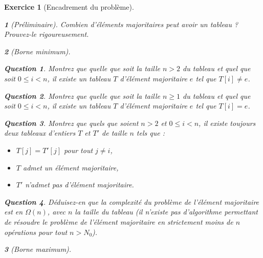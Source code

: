 \documentclass{article}
\theoremstyle{exostyle}
\newtheorem{exo}{Exercice}
\theoremstyle{partiestyle}
\newtheorem{partie}{}[exo]
\theoremstyle{questionstyle}
\newtheorem{questionpartie}{Question}[partie]
\begin{document}
\clearpage

\begin{exo}[Encadrement du problème]

\begin{partie}[Préliminaire]
Combien d'éléments majoritaires peut avoir un tableau ? Prouvez-le rigoureusement.
\end{partie}
\begin{partie}[Borne minimum]
\begin{questionpartie}
    Montrez que quelle que soit la taille $n > 2$ du tableau et quel que soit $0 \leq i < n$, il existe un tableau $T$ d'élément majoritaire $e$ tel que $T[i] \neq e$.
\end{questionpartie}
\begin{questionpartie}
    Montrez que quelle que soit la taille $n \geq 1$ du tableau et quel que soit $0 \leq i < n$, il existe un tableau $T$ d'élément majoritaire $e$ tel que $T[i] = e$.
\end{questionpartie}
\begin{questionpartie}
    Montrez que quels que soient $n>2$ et $0 \leq i < n$, il existe toujours deux tableaux d'entiers $T$ et $T'$ de taille $n$ tels que :
    \begin{itemize}
        \item $T[j] = T'[j]$ pour tout $j \neq i$,
        \item $T$ admet un élément majoritaire,
        \item $T'$ n'admet pas d'élément majoritaire.
    \end{itemize}
\end{questionpartie}
\begin{questionpartie}
    Déduisez-en que la complexité du problème de l'élément majoritaire est en $\Omega(n)$, avec $n$ la taille du tableau (il n'existe pas d'algorithme permettant de résoudre le problème de l'élément majoritaire en strictement moins de $n$ opérations pour tout $n > N_0$).
\end{questionpartie}
\end{partie}
\begin{partie}[Borne maximum]


\end{partie}
\end{exo}
\end{document}
